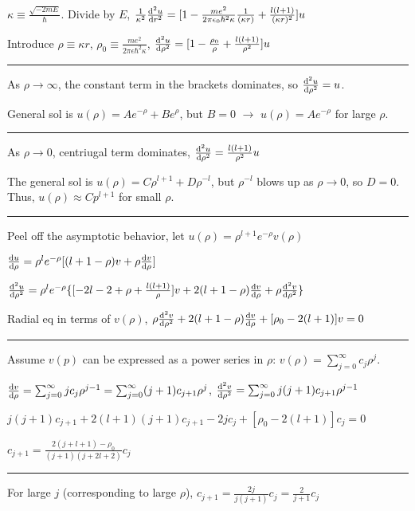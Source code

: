 \hfill

$\kappa \equiv \frac{\sqrt{-2mE}}{\hbar}$.
Divide by $E$, 
$\frac{1}{\kappa^2} \dv[2]{u}{r} = [1 - \frac{me^2}{2 \pi \epsilon_0 \hbar^2 \kappa} \frac{1}{(\kappa r)} + \frac{l (l+1)}{(\kappa r)^2}] u$

Introduce $\rho \equiv \kappa r$, $\rho_0 \equiv \frac{me^2}{2 \pi \epsilon \hbar^2 \kappa}$, $\dv[2]{u}{\rho} = [1 - \frac{\rho_0}{\rho} + \frac{l(l+1)}{\rho^2}]u$

\hrule height 0.1pt

As $\rho \rightarrow \infty$, the constant term in the brackets dominates, so $\dv[2]{u}{\rho} = u$.

General sol is $u(\rho) = Ae^{-\rho} + Be^{\rho}$, but $B=0$ $\rightarrow$ $u(\rho) = A e^{-\rho}$ for large $\rho$.

\hrule height 0.1pt

As $\rho \rightarrow 0$, centriugal term dominates, $\dv[2]{u}{\rho} = \frac{l(l+1)}{\rho^2} u$

The general sol is $u(\rho) = C \rho^{l+1} + D \rho^{-l}$, but $\rho^{-l}$ blows up as $\rho \rightarrow 0$, so $D = 0$. Thus, $u(\rho) \approx C p^{l+1}$ for small $\rho$. 

\hrule height 0.1pt

Peel off the asymptotic behavior, let $u(\rho) = \rho^{l+1} e^{-\rho} v(\rho)$

$\dv{u}{\rho} = \rho^l e^{-\rho} [(l+1-\rho) v + \rho \dv{v}{\rho}]$

$\dv[2]{u}{\rho} = \rho^l e^{-\rho} \{[-2l - 2 + \rho + \frac{l(l+1)}{\rho}]v + 2(l + 1 - \rho) \dv{v}{\rho} + \rho \dv[2]{v}{\rho} \}$

Radial eq in terms of $v(\rho)$, $\rho \dv[2]{v}{\rho} + 2(l + 1 - \rho) \dv{v}{\rho} + [\rho_0 - 2(l+1)]v = 0$

\hrule height 0.1pt

Assume $v(p)$ can be expressed as a power series in $\rho$: $v(\rho) = \sum_{j=0}^{\infty} c_j \rho^j$.

$\dv{v}{\rho} = \sum_{j=0}^{\infty} j c_j \rho^{j-1} = \sum_{j=0}^{\infty} (j+1) c_{j+1} \rho^j$, $\dv[2]{v}{\rho} = \sum_{j=0}^{\infty} j(j+1) c_{j+1} \rho^{j-1}$

$j(j+1)c_{j+1} + 2(l+1)(j+1)c_{j+1} - 2jc_j + [\rho_0 - 2(l+1)]c_j = 0$

$c_{j+1} = \frac{2(j+l+1) - \rho_0}{(j+1)(j+2l+2)} c_j$

\hrule height 0.1pt

For large $j$ (corresponding to large $\rho$), $c_{j+1} = \frac{2j}{j(j+1)}c_j = \frac{2}{j+1}c_j$

